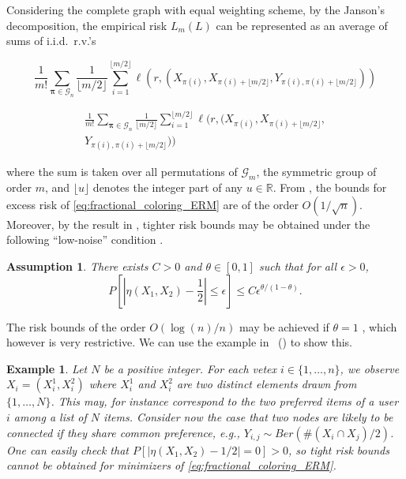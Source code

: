 \documentclass[letterpaper]{article} %
\def\DoubleColumn{}
\def\DoubleColumnEnd{}
\def\SingleColumn{}
\def\SingleColumnEnd{}
\newtheorem{example}{Example}
\newtheorem{assumption}{Assumption}
\newcommand{\Pro}{P}
\newcommand{\real}{\mathbb{R}}
\newcommand{\empiricalrisk}[1]{L_{#1}}
\newcommand{\set}[1]{\{#1\}}
\newcommand{\citet}[1]{\citeauthor{#1}\ (\citeyear{#1})}
\begin{document}
Considering the complete graph with equal weighting scheme, by the Janson's decomposition, the empirical risk $\empiricalrisk{m}(L)$ can be represented as an average of sums of i.i.d.\ r.v.'s
\SingleColumn
\begin{equation}
  \label{eq:fractional_coloring_ERM}
  \frac{1}{m!}\sum_{\bm{\pi}\in\mathcal{G}_n}\frac{1}{\lfloor m/2\rfloor}\sum_{i=1}^{\lfloor m/2 \rfloor} \ell(r, (X_{\pi(i)}, X_{\pi(i)+\lfloor m/2\rfloor}, Y_{\pi(i), \pi(i)+\lfloor m/2\rfloor}))
\end{equation}
\SingleColumnEnd
\DoubleColumn
\begin{equation}
\begin{aligned}
  \label{eq:fractional_coloring_ERM}
  \frac{1}{m!}\sum_{\bm{\pi}\in\mathcal{G}_n}\frac{1}{\lfloor m/2\rfloor}\sum_{i=1}^{\lfloor m/2 \rfloor} \ell(r, (X_{\pi(i)}, X_{\pi(i)+\lfloor m/2\rfloor}, \\
  Y_{\pi(i), \pi(i)+\lfloor m/2\rfloor}))
  \end{aligned}
\end{equation}
\DoubleColumnEnd
where the sum is taken over all permutations of $\mathcal{G}_m$, the symmetric group of order $m$, and $\lfloor u \rfloor$ denotes the integer part of any $u\in \real{}$.
From \cite{Biau2006}, the bounds for excess risk of \eqref{eq:fractional_coloring_ERM} are of the order $O(1/\sqrt{n})$.
Moreover, by the result in \cite{DBLP:conf/icml/RalaivolaA15}, tighter risk bounds may be obtained under the following ``low-noise'' condition \cite{tsybakov2004optimal,Massart2006}.
\begin{assumption}
  There exists $C>0$ and $\theta\in [0,1]$ such that for all $\epsilon>0$,
  \[\Pro\left[|\eta(X_1,X_2)-\frac{1}{2}|\le \epsilon\right]\le C\epsilon^{\theta/(1-\theta)}.\]
\end{assumption}
The risk bounds of the order $O(\log(n)/n)$ may be achieved if $\theta=1$ \cite{Massart2006}, which however is very restrictive.
We can use the example in \citet{papa2016graph} to show this.
\begin{example}
Let $N$ be a positive integer. For each vetex $i \in \set{1,\dots,n}$, we observe $X_i = (X_i^1, X_i^2)$ where $X_i^1$ and $X_i^2$ are two distinct elements drawn from $\set{1,\dots,N}$.
This may, for instance correspond to the two preferred items of a user $i$ among a list of $N$ items.
Consider now the case that two nodes are likely to be connected if they share common preference, e.g., $Y_{i,j} \sim Ber(\#(X_i\cap X_j)/2)$. One can easily check that $\Pro[|\eta(X_1,X_2)-1/2|=0]>0$, so tight risk bounds cannot be obtained for minimizers of \eqref{eq:fractional_coloring_ERM}.
\end{example}
\end{document}
